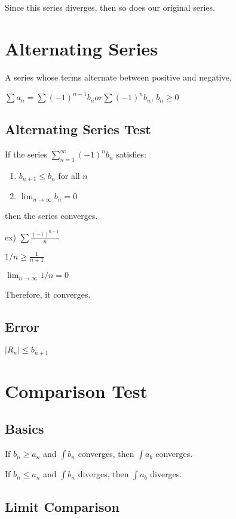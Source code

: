 \documentclass{article}
\begin{document}
Since this series diverges, then so does our original series.


\section{Alternating Series}

A series whose terms alternate between positive and negative.

$\sum a_n = \sum (-1)^{n-1}b_n or \sum (-1)^n b_n$, $b_n\geq 0$

\subsection{Alternating Series Test}

If the series $\sum_{n=1}^\infty (-1)^n b_n$ satisfies:
\begin{enumerate}
    \item $b_{n+1}\leq b_n$ for all $n$
    \item $\lim_{n\to\infty} b_n = 0$
\end{enumerate}

then the series converges.

ex) $\sum \frac{(-1)^{n-1}}{n}$

$1/n \geq \frac{1}{n+1}$

$\lim_{n\to\infty} 1/n = 0$

Therefore, it converges.

\subsection{Error}

$|R_n| \leq b_{n+1}$

\section{Comparison Test}

\subsection{Basics}

If $b_n \geq a_n$ and $\int b_n$ converges, then $\int a_b$ converges.

If $b_n \leq a_n$ and $\int b_n$ diverges, then $\int a_b$ diverges.

\subsection{Limit Comparison}
\end{document}
